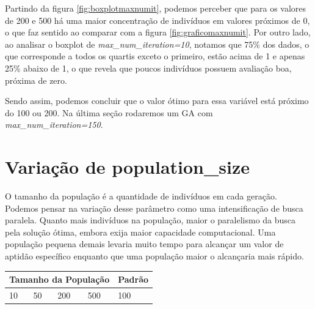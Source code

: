 \documentclass[12pt]{article}
\begin{document}
Partindo da figura \ref{fig:boxplotmaxnumit}, podemos perceber que para os valores de 200 e 500 há uma maior concentração de indivíduos em valores próximos de 0, o que faz sentido ao comparar com a figura \ref{fig:graficomaxnumit}. Por outro lado, ao analisar o boxplot de \textit{max\_num\_iteration=10}, notamos que 75\% dos dados, o que corresponde a todos os quartis exceto o primeiro, estão acima de 1 e apenas 25\% abaixo de 1, o que revela que poucos indivíduos possuem avaliação boa, próxima de zero.

Sendo assim, podemos concluir que o valor ótimo para essa variável está próximo do 100 ou 200. Na última seção rodaremos um GA com \textit{max\_num\_iteration=150}.


\section{Variação de population\_size}

O tamanho da população é a quantidade de indivíduos em cada geração. Podemos pensar na variação desse parâmetro como uma intensificação de busca paralela. Quanto mais indivíduos na população, maior o paralelismo da busca pela solução ótima, embora exija maior capacidade computacional. Uma população pequena demais levaria muito tempo para alcançar um valor de aptidão específico enquanto que uma população maior o alcançaria mais rápido.

\begin{table}[H]
	\centering
	\begin{tabular}{|l|l|l|l|l|}
		\hline
		\multicolumn{4}{|l|}{Tamanho da População}& Padrão \\ \hline
		10   & 50    & 200    & 500   & 100 \\ \hline
	\end{tabular}
\end{table}
\end{document}
